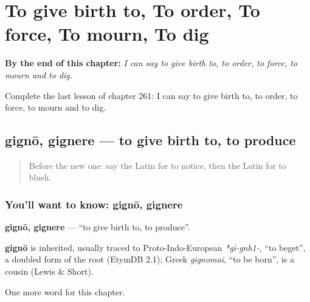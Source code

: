 
\chapter{To give birth to, To order, To force, To mourn, To dig}
\label{ch:la-to-give-birth-to-to-order-to-force-to-mourn-to-dig}

\begin{chapteropening}
\textbf{By the end of this chapter:} \emph{I can say to give birth to, to order, to force, to mourn and to dig.}

Complete the last lesson of chapter 261: I can say to give birth to, to order, to force, to mourn and to dig.
\end{chapteropening}

\section[gignō, gignere]{gignō, gignere — to give birth to, to produce}

\label{lesson:LA-C261-gigno}



\begin{quote}
Before the new one: say the Latin for to notice, then the Latin for to blush.
\end{quote}

\subsection*{You'll want to know: gignō, gignere}
\textbf{gignō, gignere} — \textquotedblleft{}to give birth to, to produce\textquotedblright{}.

\begin{cousinweb}
\textbf{gignō} is inherited, usually traced to Proto-Indo-European \emph{*gi-gnh1-}, \textquotedblleft{}to beget\textquotedblright{}, a doubled form of the root (EtymDB 2.1); Greek \emph{gignomai}, \textquotedblleft{}to be born\textquotedblright{}, is a cousin (Lewis \& Short).
\end{cousinweb}

\begin{grammarlens}[title={What you've built}]
One more word for this chapter.
\end{grammarlens}

